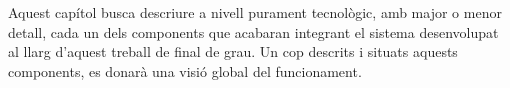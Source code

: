 Aquest capítol busca descriure a nivell purament tecnològic, amb major o menor detall, cada un dels components que acabaran integrant el sistema desenvolupat al llarg d'aquest treball de final de grau. Un cop descrits i situats aquests components, es donarà una visió global del funcionament.

\clearpage

\clearpage

\clearpage

\clearpage

\clearpage